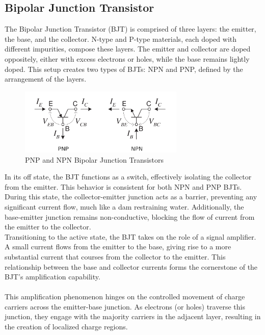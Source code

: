     \subsection{Bipolar Junction Transistor}
        The Bipolar Junction Transistor (BJT) is comprised of three layers: the emitter, the base, and the collector. 
        N-type and P-type materials, each doped with different impurities, compose these layers. 
        The emitter and collector are doped oppositely, either with excess electrons or holes, while the base remains lightly doped. 
        This setup creates two types of BJTs: NPN and PNP, defined by the arrangement of the layers.
        \begin{figure}[H]
            \centering
            \includegraphics[width=0.7\textwidth]{figures/PNP_NPN.png}
            \caption{PNP and NPN Bipolar Junction Transistors}
            \label{fig:PNP_NPN}
        \end{figure}
        \noindent
        In its off state, the BJT functions as a switch, effectively isolating the collector from the emitter. 
        This behavior is consistent for both NPN and PNP BJTs. During this state, the collector-emitter junction acts as a barrier, preventing any significant current flow, much like a dam restraining water. 
        Additionally, the base-emitter junction remains non-conductive, blocking the flow of current from the emitter to the collector. \\
        Transitioning to the active state, the BJT takes on the role of a signal amplifier. A small current flows from the emitter to the base, giving rise to a more substantial current that courses from the collector to the emitter. 
        This relationship between the base and collector currents forms the cornerstone of the BJT's amplification capability. \\\\
        This amplification phenomenon hinges on the controlled movement of charge carriers across the emitter-base junction. 
        As electrons (or holes) traverse this junction, they engage with the majority carriers in the adjacent layer, resulting in the creation of localized charge regions. 
